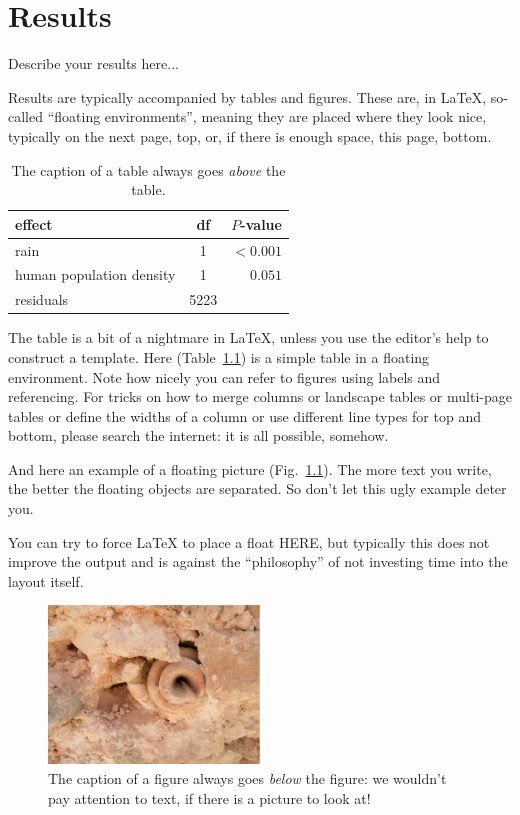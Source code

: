\chapter{Results}
\label{ch:results}

Describe your results here...

Results are typically accompanied by tables and figures. These are, in \LaTeX, so-called ``floating environments'', meaning they are placed where they look nice, typically on the next page, top, or, if there is enough space, this page, bottom.


\begin{table}
	\caption{The caption of a table always goes \emph{above} the table.} \label{tab:example}	
	\centering
	\begin{tabular}{lcr} %
		\hline
		effect  & df  & $P$-value \\ \hline
		rain    & 1   & $<0.001$ \\
		human population density & 1 & $0.051$ \\
		residuals & 5223 &  \\ \hline
	\end{tabular}
\end{table}

The table is a bit of a nightmare in \LaTeX, unless you use the editor's help to construct a template. Here (Table~\ref{tab:example}) is a simple table in a floating environment. Note how nicely you can refer to figures using labels and referencing.
For tricks on how to merge columns or landscape tables or multi-page tables or define the widths of a column or use different line types for top and bottom, please search the internet: it is all possible, somehow.

And here an example of a floating picture (Fig.~\ref{fig:example}). The more text you write, the better the floating objects are separated. So don't let this ugly example deter you. 

You can try to force \LaTeX\/ to place a float HERE, but typically this does not improve the output and is against the ``philosophy'' of not investing time into the layout itself.

\begin{figure}
	\centering
	\includegraphics[width=0.5\textwidth]{images/bsc-fossil}
	\caption{The caption of a figure always goes \emph{below} the figure: we wouldn't pay attention to text, if there is a picture to look at!} \label{fig:example}
\end{figure}